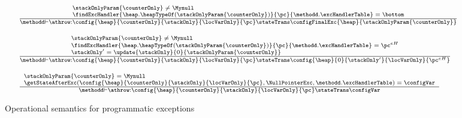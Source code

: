  \begin{figure}[ht!] 
\begin{frameit}
 $$ \begin{array}{l}
 {\scriptsize \frac{ 
	             \begin{array}{l}	 
		           \stackOnlyParam{\counterOnly} \neq \Mynull   \\
			   \findExcHandler{\heap.\heapTypeOf(  \stackOnlyParam{\counterOnly} )  }{\pc}{\methodd.\excHandlerTable} = \bottom 
		     \end{array}	     
	      }
              {\methodd \vdash \athrow :  \config{\heap}{\counterOnly}{\stackOnly}{\locVarOnly}{\pc} 
		                         \stateTrans  
					\configFinalExc{\heap }{\stackOnlyParam{\counterOnly} }} } \\ \\ 
{\scriptsize \frac{ \begin{array}{l}	 
		                \stackOnlyParam{\counterOnly} \neq \Mynull   \\
				\findExcHandler{\heap.\heapTypeOf(  \stackOnlyParam{\counterOnly} )  }{\pc}{\methodd.\excHandlerTable} = \pc^{eH} \\
				\stackOnly' = \update{\stackOnly}{0}{ \stackOnlyParam{\counterOnly} } \\
			    \end{array}	     
	      }
              {\methodd \vdash \athrow :  \config{\heap}{\counterOnly}{\stackOnly}{\locVarOnly}{\pc} 
		                          \stateTrans  
					   \config{\heap}{0}{\stackOnly'}{\locVarOnly}{\pc^{eH}}  } } \\ \\  
              {\scriptsize \frac{ \begin{array}{l}	 
	                     \stackOnlyParam{\counterOnly}  = \Mynull   \\
			     \getStateAfterExc( \config{\heap}{\counterOnly}{\stackOnly}{\locVarOnly}{\pc}, \NullPointerExc  ,\methodd.\excHandlerTable ) =  \configVar
      		    \end{array}	     
	      }
              {\methodd \vdash \athrow :  \config{\heap}{\counterOnly}{\stackOnly}{\locVarOnly}{\pc} 
		                         \stateTrans  
					  \configVar} } 
	   
\end{array}$$
\caption{\sc Operational semantics for programmatic exceptions }
\label{opSem:obj:throw}
\end{frameit}
\end{figure}

